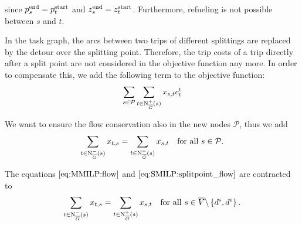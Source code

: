 since $p^{\operatorname{end}}_s = p^{\operatorname{start}}_t$ and $z^{\operatorname{end}}_s = z^{\operatorname{start}}_t$. Furthermore, refueling is not possible between $s$ and $t$.

In the task graph, the arcs between two trips of different splittings are replaced by the detour over the splitting point. Therefore, the trip costs of a trip directly after a split point are not considered in the objective function any more. In order to compensate this, we add the following term to the objective function:
\begin{align*}
	\sum_{s\in \mathcal{P}}\sum_{t\in\operatorname{N}_{\overline{G}}^+(s)}x_{s,t}c^{\operatorname{t}}_t
\end{align*}

We want to ensure the flow conservation also in the new nodes $\mathcal{P}$, thus we add
\begin{align}
	\sum_{t\in\operatorname{N}_{\overline{G}}^-(s)} x_{t,s} = \sum_{t\in\operatorname{N}_{\overline{G}}^+(s)} x_{s,t} & & \text{for all } s\in\mathcal{P}. \label{eq:SMILP:splitpoint_flow}
\end{align}

The equations $\eqref{eq:MMILP:flow}$ and $\eqref{eq:SMILP:splitpoint_flow}$ are contracted to
\begin{align}
	\sum_{t\in\operatorname{N}_{\overline{G}}^-(s)} x_{t,s} = \sum_{t\in\operatorname{N}_{\overline{G}}^+(s)} x_{s,t} & & \text{for all } s\in \overline{V}\backslash\left\{d^{\operatorname{s}},d^{\operatorname{e}}\right\}. \label{eq:SMILP:flow}
\end{align}

